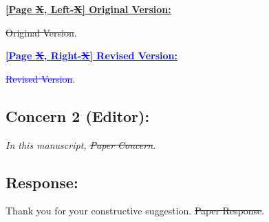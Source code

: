 \begin{tcolorbox}[colframe=black,colback=white,arc=0mm,boxrule=0.5mm, left=1mm, right=1mm, top=1mm, bottom=1mm, use color stack,breakable]

  \noindent \textbf{\underline{[Page \sout{X}, Left-\sout{X}] Original Version:}}

  \vspace{1mm}

  \noindent
  \sout{Original Version}.

  \hrulefill
  \vspace{1mm}

  \noindent \textbf{\textcolor{blue}{\underline{[Page \sout{X}, Right-\sout{X}] Revised Version:}}}

  \vspace{1mm}

  \noindent
  \textcolor{blue}{
    \sout{Revised Version}.
  }

\end{tcolorbox}

{}
\subsection*{Concern 2 (Editor):}
\textit{In this manuscript, \sout{Paper Concern}.}

\subsection*{Response:}
Thank you for your constructive suggestion.
\sout{Paper Response}.

